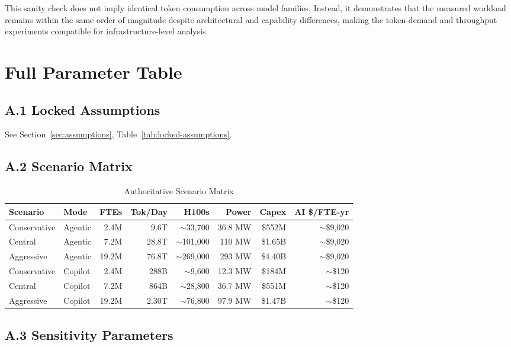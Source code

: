 \documentclass{article}
\begin{document}
This sanity check does not imply identical token consumption across model
families. Instead, it demonstrates that the measured workload remains
within the same order of magnitude despite architectural and capability
differences, making the token-demand and throughput experiments
compatible for infrastructure-level analysis.

\section{Full Parameter Table}
\label{app:parameters}

\subsection*{A.1 Locked Assumptions}

See Section~\ref{sec:assumptions}, Table~\ref{tab:locked-assumptions}.

\subsection*{A.2 Scenario Matrix}

\begin{table}[ht]
\centering
\caption{Authoritative Scenario Matrix}
\label{tab:scenario-matrix}
\small
\begin{tabular}{@{}llrrrrrr@{}}
\hline
\textbf{Scenario} & \textbf{Mode} & \textbf{FTEs} & \textbf{Tok/Day} & \textbf{H100s} & \textbf{Power} & \textbf{Capex} & \textbf{AI \$/FTE-yr} \\
\hline
Conservative & Agentic & 2.4M & 9.6T & $\sim$33,700 & 36.8 MW & \$552M & $\sim$\$9,020 \\
Central & Agentic & 7.2M & 28.8T & $\sim$101,000 & 110 MW & \$1.65B & $\sim$\$9,020 \\
Aggressive & Agentic & 19.2M & 76.8T & $\sim$269,000 & 293 MW & \$4.40B & $\sim$\$9,020 \\
Conservative & Copilot & 2.4M & 288B & $\sim$9,600 & 12.3 MW & \$184M & $\sim$\$120 \\
Central & Copilot & 7.2M & 864B & $\sim$28,800 & 36.7 MW & \$551M & $\sim$\$120 \\
Aggressive & Copilot & 19.2M & 2.30T & $\sim$76,800 & 97.9 MW & \$1.47B & $\sim$\$120 \\
\hline
\end{tabular}
\end{table}

\subsection*{A.3 Sensitivity Parameters}
\end{document}
